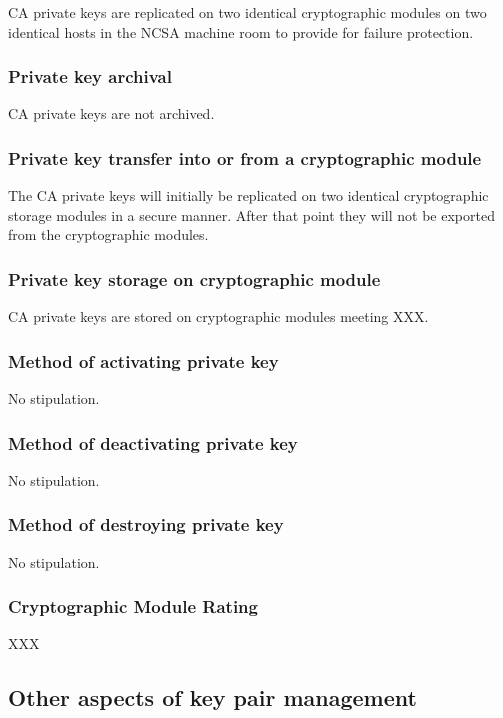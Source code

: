 \documentclass[10pt]{article}
\begin{document}
CA private keys are replicated on two identical cryptographic modules
on two identical hosts in the NCSA machine room to provide for failure
protection.

\subsubsection{Private key archival}

CA private keys are not archived.

\subsubsection{Private key transfer into or from a cryptographic module}

The CA private keys will initially be replicated on two identical
cryptographic storage modules in a secure manner. After that point
they will not be exported from the cryptographic modules.

\subsubsection{Private key storage on cryptographic module}

CA private keys are stored on cryptographic modules meeting XXX.

\subsubsection{Method of activating private key}

No stipulation.

\subsubsection{Method of deactivating private key}

No stipulation.

\subsubsection{Method of destroying private key}

No stipulation.

\subsubsection{Cryptographic Module Rating}

XXX

\subsection{Other aspects of key pair management}
\end{document}
